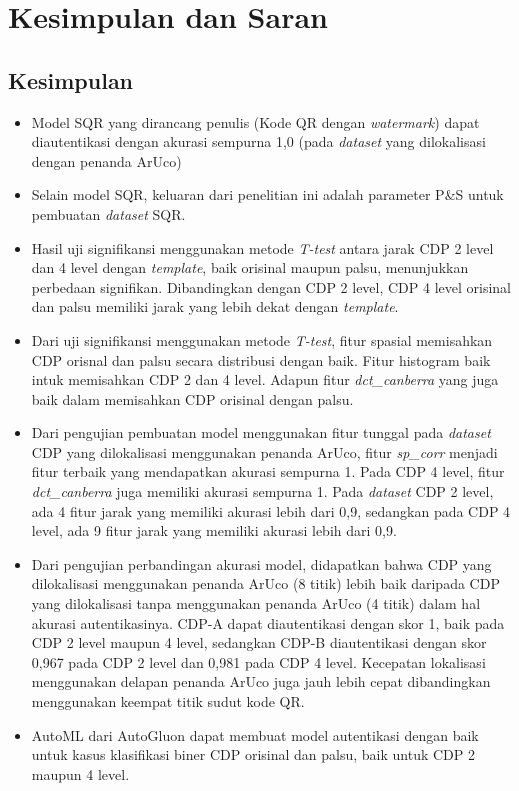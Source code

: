 \chapter{Kesimpulan dan Saran}

\section{Kesimpulan}
\begin{itemize}
    \item Model SQR yang dirancang penulis (Kode QR dengan \emph{watermark}) dapat diautentikasi dengan akurasi sempurna 1,0 (pada \emph{dataset} yang dilokalisasi
          dengan penanda ArUco)
    \item Selain model SQR, keluaran dari penelitian ini adalah parameter P\&S untuk pembuatan \emph{dataset} SQR.
    \item Hasil uji signifikansi menggunakan metode \emph{T-test} antara jarak CDP 2 level dan 4 level dengan \emph{template}, baik orisinal maupun palsu, menunjukkan
          perbedaan signifikan. Dibandingkan dengan CDP 2 level, CDP 4 level orisinal dan palsu memiliki jarak yang lebih dekat dengan \emph{template}.
    \item Dari uji signifikansi menggunakan metode \emph{T-test}, fitur spasial memisahkan CDP orisnal dan palsu secara distribusi dengan baik. Fitur histogram baik
          intuk memisahkan CDP 2 dan 4 level. Adapun fitur \emph{dct\_canberra} yang juga baik dalam memisahkan CDP orisinal dengan palsu.
    \item Dari pengujian pembuatan model menggunakan fitur tunggal pada \emph{dataset} CDP yang dilokalisasi menggunakan penanda ArUco, fitur \emph{sp\_corr} menjadi
          fitur terbaik yang mendapatkan akurasi sempurna 1. Pada CDP 4 level, fitur \emph{dct\_canberra} juga memiliki akurasi sempurna 1. Pada \emph{dataset} CDP 2
          level, ada 4 fitur jarak yang memiliki akurasi lebih dari 0,9, sedangkan pada CDP 4 level, ada 9 fitur jarak yang memiliki akurasi lebih dari 0,9.
    \item Dari pengujian perbandingan akurasi model, didapatkan bahwa CDP yang dilokalisasi menggunakan penanda ArUco (8 titik) lebih baik daripada CDP yang dilokalisasi
          tanpa menggunakan penanda ArUco (4 titik) dalam hal akurasi autentikasinya. CDP-A dapat diautentikasi dengan skor 1, baik pada CDP 2 level maupun 4 level,
          sedangkan CDP-B diautentikasi dengan skor 0,967 pada CDP 2 level dan 0,981 pada CDP 4 level. Kecepatan lokalisasi menggunakan delapan penanda ArUco juga jauh
          lebih cepat dibandingkan menggunakan keempat titik sudut kode QR.
    \item AutoML dari AutoGluon dapat membuat model autentikasi dengan baik untuk kasus klasifikasi biner CDP orisinal dan palsu, baik untuk CDP 2 maupun 4 level.
\end{itemize}


